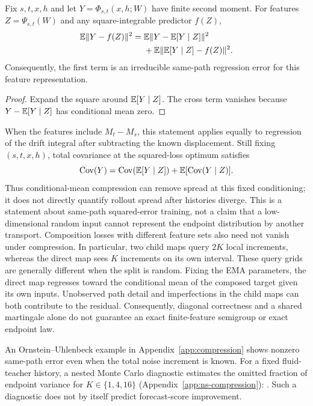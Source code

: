\begin{proposition}\label{prop:compression}
Fix $s,t,x,h$ and let $Y=\Phi_{s,t}(x,h;W)$ have finite second moment. For features $Z=\Psi_{s,t}(W)$ and any square-integrable predictor $f(Z)$,
\begin{align}
 \mathbb{E}\|Y-f(Z)\|^2={}&
 \mathbb{E}\|Y-\mathbb{E}[Y\mid Z]\|^2\nonumber\\
 &+\mathbb{E}\|\mathbb{E}[Y\mid Z]-f(Z)\|^2.
 \label{eq:compression}
\end{align}
Consequently, the first term is an irreducible same-path regression error for this feature representation.
\end{proposition}
\begin{proof}
Expand the square around $\mathbb{E}[Y\mid Z]$. The cross term vanishes because $Y-\mathbb{E}[Y\mid Z]$ has conditional mean zero.
\end{proof}
When the features include $M_t-M_s$, this statement applies equally to regression of the drift integral after subtracting the known displacement. Still fixing $(s,t,x,h)$, total covariance at the squared-loss optimum satisfies
\begin{equation}
 \operatorname{Cov}(Y)=\operatorname{Cov}(\mathbb{E}[Y\mid Z])
 +\mathbb{E}[\operatorname{Cov}(Y\mid Z)].
\end{equation}
Thus conditional-mean compression can remove spread at this fixed conditioning; it does not directly quantify rollout spread after histories diverge. This is a statement about same-path squared-error training, not a claim that a low-dimensional random input cannot represent the endpoint distribution by another transport. Composition losses with different feature sets also need not vanish under compression. In particular, two child maps query $2K$ local increments, whereas the direct map sees $K$ increments on its own interval. These query grids are generally different when the split is random. Fixing the EMA parameters, the direct map regresses toward the conditional mean of the composed target given its own inputs. Unobserved path detail and imperfections in the child maps can both contribute to the residual. Consequently, diagonal correctness and a shared martingale alone do not guarantee an exact finite-feature semigroup or exact endpoint law.

An Ornstein--Uhlenbeck example in Appendix~\ref{app:compression} shows nonzero same-path error even when the total noise increment is known. For a fixed fluid-teacher history, a nested Monte Carlo diagnostic estimates the omitted fraction of endpoint variance for $K\in\{1,4,16\}$ (Appendix~\ref{app:ns-compression}): . Such a diagnostic does not by itself predict forecast-score improvement.
